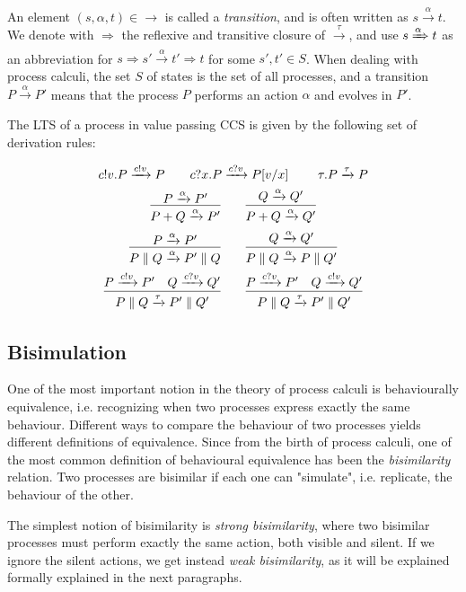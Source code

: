 An element $(s, \alpha, t) \in \rightarrow$ is called a \textit{transition}, and is often written as $s \xrightarrow{\alpha} t$. We denote with $\Rightarrow$ the reflexive and transitive closure of $\xrightarrow{\tau}$, and use $s \xRightarrow{\alpha} t$ as an abbreviation for $s \Rightarrow s' \xrightarrow{\alpha} t' \Rightarrow t$ for some $s', t' \in S$. When dealing with process calculi, the set $S$ of states is the set of all processes, and a transition $P \xrightarrow{\alpha} P'$ means that the process $P$ performs an action $\alpha$ and evolves in $P'$.

The LTS of a process in value passing CCS is given by the following set of derivation rules: 

\begin{gather*}
c!v.P \xrightarrow{c!v} P \qquad c?x.P \xrightarrow{c?v} P[v/x] \qquad \	\tau.P \xrightarrow{\tau} P
\\
\infer{P + Q \xrightarrow{\alpha} P'}{P \xrightarrow{\alpha} P'} \qquad \infer{P + Q \xrightarrow{\alpha} Q'}{Q \xrightarrow{\alpha} Q'} 
\\
\infer{P \parallel Q \xrightarrow{\alpha} P'\parallel Q}{P \xrightarrow{\alpha} P'} \qquad \infer{P \parallel Q \xrightarrow{\alpha} P\parallel Q'}{Q \xrightarrow{\alpha} Q'} 
\\
\infer{P \parallel Q \xrightarrow{\tau} P'\parallel Q'}{P \xrightarrow{c!v} P' & Q \xrightarrow{c?v} Q' } \qquad
\infer{P \parallel Q \xrightarrow{\tau} P'\parallel Q'}{P \xrightarrow{c?v} P' & Q \xrightarrow{c!v} Q' } 
\\
\end{gather*}

\subsection{Bisimulation}

One of the most important notion in the theory of process calculi is behaviourally equivalence, i.e. recognizing when two processes express exactly the same behaviour. Different ways to compare the behaviour of two processes yields different definitions of equivalence. Since from the birth of process calculi, one of the most common definition of behavioural equivalence has been the \textit{bisimilarity} relation. Two processes are bisimilar if each one can "simulate", i.e. replicate, the behaviour of the other. 

The simplest notion of bisimilarity is \textit{strong bisimilarity}, where two bisimilar processes must perform exactly the same action, both visible and silent. If we ignore the silent actions, we get instead \textit{weak bisimilarity}, as it will be explained formally   explained in the next paragraphs.


